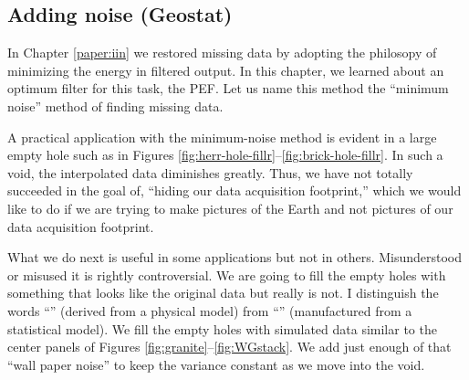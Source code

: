 \subsection{Adding noise (Geostat)}
In Chapter \ref{paper:iin} we restored missing data
by adopting the philosopy of minimizing the energy in filtered output.
In this chapter, we learned about an optimum filter
for this task, the PEF.
Let us name this method the ``minimum noise'' method
of finding missing data.

\par
A practical application with the minimum-noise method is evident
in a large empty hole such as 
in Figures \ref{fig:herr-hole-fillr}--\ref{fig:brick-hole-fillr}.
In such a void, the interpolated data diminishes greatly.
Thus, we have not totally succeeded in the goal of,
``hiding our data acquisition footprint,''
which we would like to do if we are trying to make
pictures of the Earth and not pictures of our
data acquisition footprint.

\par
What we do next is useful in some applications but not in others.
Misunderstood or misused it is rightly controversial.
We are going to fill the empty holes
with something that looks like the original data but really is not.
I distinguish the words ``''
(derived from a physical model)
from ``'' (manufactured from a statistical model).
We fill the empty holes with simulated data
similar to the center panels of Figures
\ref{fig:granite}--\ref{fig:WGstack}.
We add just enough of that ``wall paper noise'' to keep
the variance constant as we move into the void.

